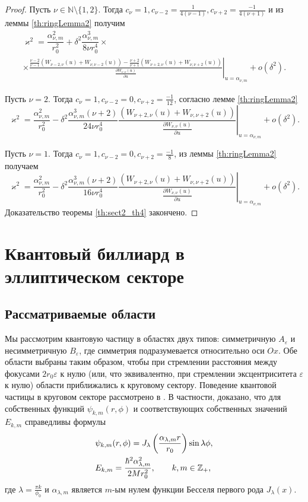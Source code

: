 \begin{proof}
Пусть $\nu \in \mathbb{N} \setminus \{1, 2\}$. Тогда $c_\nu=1,
	c_{\nu-2} = \frac{1}{4(\nu-1)}, c_{\nu+2} = \frac{-1}{4(\nu+1)}$ и из леммы \ref{th:ringLemma2}  получим
\begin{multline*}
\varkappa^2 = \dfrac{\alpha_{\nu, m}^2}{r_0^2} + \delta^2 \dfrac{\alpha_{\nu, m}^3}{8 \nu r_0^4} \times \\
 \times \left. \frac{
\frac{\nu-2}{\nu-1}
\left(
W_{\nu-2, \nu}(u) + W_{\nu, \nu-2}(u)
\right)- 
\frac{\nu+2}{\nu+1}
\left(
W_{\nu+2, \nu}(u) + W_{\nu, \nu+2}(u)
\right)
}{ \frac{\partial W_{\nu,\nu}(u)}{\partial u} }\right|_{u=\alpha_{\nu, m}} + o(\delta^2).
\end{multline*}


Пусть $\nu = 2$. Тогда $c_\nu = 1, c_{\nu-2} = 0, c_{\nu+2} = \frac{-1}{12} $, согласно лемме \ref{th:ringLemma2} 
$$\varkappa^2 = \dfrac{\alpha_{\nu, m}^2}{r_0^2} - \delta^2 \dfrac{\alpha_{\nu, m}^3(\nu+2)}{24 \nu  r_0^4} \left. \frac{
	\left(
	W_{\nu+2, \nu}(u) + W_{\nu, \nu+2}(u)
	\right)
}{ \frac{\partial W_{\nu,\nu}(u)}{\partial u} }\right|_{u=\alpha_{\nu, m}} + o(\delta^2).$$

Пусть $\nu = 1$. Тогда $c_\nu = 1, c_{\nu-2} = 0, c_{\nu+2} = \frac{-1}{8}$, из леммы \ref{th:ringLemma2}  получаем
$$\varkappa^2 = \dfrac{\alpha_{\nu, m}^2}{r_0^2} - \delta^2 \dfrac{\alpha_{\nu, m}^3 (\nu+2)}{16 \nu r_0^4}
\left. \frac{
	\left(
	W_{\nu+2, \nu}(u) + W_{\nu, \nu+2}(u)
	\right)
}{ \frac{\partial W_{\nu,\nu}(u)}{\partial u} }\right|_{u=\alpha_{\nu, m}} + o(\delta^2).$$
Доказательство теоремы \ref{th:sect2_th4} закончено.
\end{proof}

\section{Квантовый биллиард в эллиптическом секторе}\label{sec:ch2/sec2}
\subsection{Рассматриваемые области}\label{sec:ch2/sec2/sub1}

Мы рассмотрим квантовую частицу в областях двух типов: симметричную $A_\varepsilon$ и несимметричную $B_\varepsilon$, где симметрия подразумевается относительно оси $Ox$.
Обе области выбраны таким образом, чтобы при стремлении расстояния между фокусами $2r_0 \varepsilon $ к нулю (или, что эквивалентно, при стремлении эксцентриситета $\varepsilon$ к нулю) области приближались к круговому сектору.
Поведение квантовой частицы в круговом секторе рассмотрено в \cite{wref13}.
В частности, доказано, что для собственных функций $\psi_{k,m}(r,\phi)$ и соответствующих собственных значений $E_{k,m}$ справедливы формулы
\begin{align}
&\psi_{k, m}(r, \phi) = J_\lambda\left(\frac{\alpha_{\lambda, m}r}{r_0}\right)\sin{\lambda\phi}, \notag \\  
&E_{k,m} = \frac{\hbar^2 \alpha_{\lambda, m}^2}{2M r_0^2},
 \qquad k, m \in \mathbb{Z}_+, \label{eq:energy0}
\end{align}
где 
$\lambda = \frac{\pi k}{\phi_0}$ и $\alpha_{\lambda, m}$ является
$m$-ым нулем функции Бесселя первого рода $J_\lambda(x)$.

